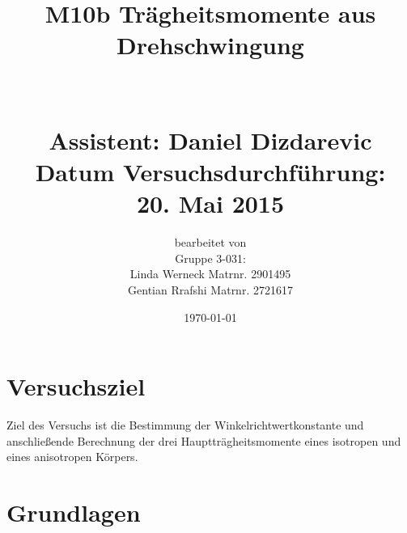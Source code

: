 \documentclass[fontsize=12pt]{scrartcl}
\begin{document}
\begin{minipage}{\textwidth}
\begin{center}\large
\title{M10b Trägheitsmomente aus Drehschwingung \\
		~\\
		~\\
		Assistent: Daniel Dizdarevic \\
		Datum Versuchsdurchführung: \\
		20. Mai 2015}

\author{bearbeitet von\\
		Gruppe 3-031: \\
		Linda Werneck Matrnr. 2901495 \\
		Gentian Rrafshi Matrnr. 2721617 }
\date{\today}

\maketitle

\end{center}
\end{minipage}

\newpage

\tableofcontents

\newpage
\noindent

\section{ Versuchsziel}

Ziel des Versuchs ist die Bestimmung der Winkelrichtwertkonstante und anschließende Berechnung der drei Hauptträgheitsmomente eines isotropen und eines anisotropen Körpers.

\section{ Grundlagen}
\end{document}
